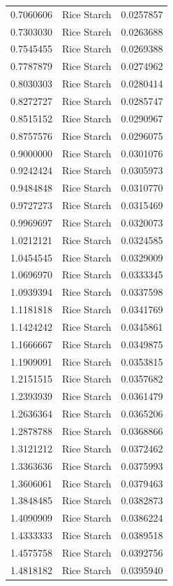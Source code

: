\documentclass[
  12pt,
]{article}
\begin{document}
{\begin{longtable}[]{@{}rlr@{}}
0.7060606 & Rice Starch & 0.0257857 \\
0.7303030 & Rice Starch & 0.0263688 \\
0.7545455 & Rice Starch & 0.0269388 \\
0.7787879 & Rice Starch & 0.0274962 \\
0.8030303 & Rice Starch & 0.0280414 \\
0.8272727 & Rice Starch & 0.0285747 \\
0.8515152 & Rice Starch & 0.0290967 \\
0.8757576 & Rice Starch & 0.0296075 \\
0.9000000 & Rice Starch & 0.0301076 \\
0.9242424 & Rice Starch & 0.0305973 \\
0.9484848 & Rice Starch & 0.0310770 \\
0.9727273 & Rice Starch & 0.0315469 \\
0.9969697 & Rice Starch & 0.0320073 \\
1.0212121 & Rice Starch & 0.0324585 \\
1.0454545 & Rice Starch & 0.0329009 \\
1.0696970 & Rice Starch & 0.0333345 \\
1.0939394 & Rice Starch & 0.0337598 \\
1.1181818 & Rice Starch & 0.0341769 \\
1.1424242 & Rice Starch & 0.0345861 \\
1.1666667 & Rice Starch & 0.0349875 \\
1.1909091 & Rice Starch & 0.0353815 \\
1.2151515 & Rice Starch & 0.0357682 \\
1.2393939 & Rice Starch & 0.0361479 \\
1.2636364 & Rice Starch & 0.0365206 \\
1.2878788 & Rice Starch & 0.0368866 \\
1.3121212 & Rice Starch & 0.0372462 \\
1.3363636 & Rice Starch & 0.0375993 \\
1.3606061 & Rice Starch & 0.0379463 \\
1.3848485 & Rice Starch & 0.0382873 \\
1.4090909 & Rice Starch & 0.0386224 \\
1.4333333 & Rice Starch & 0.0389518 \\
1.4575758 & Rice Starch & 0.0392756 \\
1.4818182 & Rice Starch & 0.0395940 \\

\end{longtable}}
\end{document}
